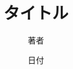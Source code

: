 \documentclass[12pt, unicode]{beamer}
\title{タイトル}
\author{著者}
\date{日付}
\begin{document}
\frame{\maketitle}

\begin{frame}
\end{frame}
\end{document}
